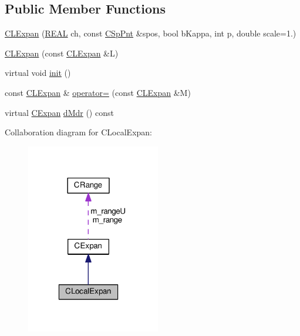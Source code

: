\subsection*{Public Member Functions}
\begin{DoxyCompactItemize}
\item 
\hyperlink{classCLExpan_a70aa27dc869e15334f170a5ce6de0060}{C\-L\-Expan} (\hyperlink{util_8h_a5821460e95a0800cf9f24c38915cbbde}{R\-E\-A\-L} ch, const \hyperlink{classCSpPnt}{C\-Sp\-Pnt} \&spos, bool b\-Kappa, int p, double scale=1.)
\item 
\hyperlink{classCLExpan_abdad541bae891eaf8c8c6c5e1910c339}{C\-L\-Expan} (const \hyperlink{classCLExpan}{C\-L\-Expan} \&L)
\item 
virtual void \hyperlink{classCLExpan_a965e320a6287db9e6f2b79ad0e0c7861}{init} ()
\item 
const \hyperlink{classCLExpan}{C\-L\-Expan} \& \hyperlink{classCLExpan_af787b152eb9c35ed7e554d9d68519c4a}{operator=} (const \hyperlink{classCLExpan}{C\-L\-Expan} \&M)
\item 
virtual \hyperlink{classCExpan}{C\-Expan} \hyperlink{classCLExpan_acdececf909b426f67e079418ff01bc45}{d\-Mdr} () const 
\end{DoxyCompactItemize}


Collaboration diagram for C\-Local\-Expan\-:\nopagebreak
\begin{figure}[H]
\begin{center}
\leavevmode
\includegraphics[width=166pt]{classCLocalExpan__coll__graph}
\end{center}
\end{figure}
